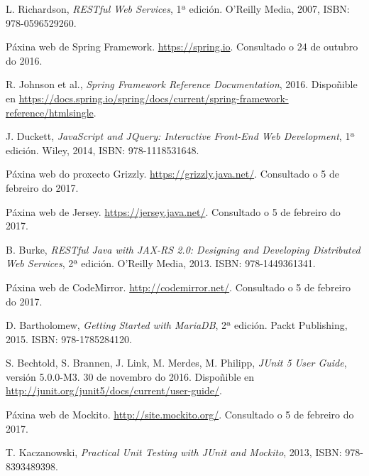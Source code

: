 \begin{thebibliography}{99}
 L. Richardson, \textit{RESTful Web Services}, 1ª edición.
O'Reilly Media, 2007, ISBN: 978-0596529260.

 Páxina web de Spring Framework. \url{https://spring.io}.
Consultado o 24 de outubro do 2016.

 R. Johnson et al., \textit{Spring Framework Reference
Documentation}, 2016.
Dispoñible en
\url{https://docs.spring.io/spring/docs/current/spring-framework-reference/htmlsingle}.

 J. Duckett, \textit{JavaScript and JQuery: Interactive
Front-End Web Development}, 1ª edición. Wiley, 2014, ISBN: 978-1118531648.

 Páxina web do proxecto Grizzly.
\url{https://grizzly.java.net/}. Consultado o 5 de febreiro do 2017.

 Páxina web de Jersey. \url{https://jersey.java.net/}.
Consultado o 5 de febreiro do 2017.

 B. Burke, \textit{RESTful Java with JAX-RS 2.0: Designing and
Developing Distributed Web Services}, 2ª edición. O'Reilly Media, 2013. ISBN:
978-1449361341.

 Páxina web de CodeMirror. \url{http://codemirror.net/}.
Consultado o 5 de febreiro do 2017.

 D. Bartholomew, \textit{Getting Started with MariaDB}, 2ª
edición. Packt Publishing, 2015. ISBN: 978-1785284120.

 S. Bechtold, S. Brannen, J. Link, M. Merdes, M. Philipp,
\textit{JUnit 5 User Guide}, versión 5.0.0-M3. 30 de novembro do 2016.
Dispoñible en \url{http://junit.org/junit5/docs/current/user-guide/}.

 Páxina web de Mockito. \url{http://site.mockito.org/}.
Consultado o 5 de febreiro do 2017.

 T. Kaczanowski, \textit{Practical Unit Testing with JUnit
and Mockito}, 2013, ISBN: 978-8393489398.

\end{thebibliography}